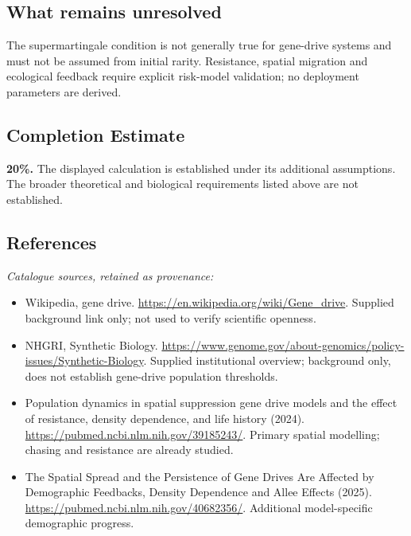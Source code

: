 \documentclass[11pt]{article}
\begin{document}
\subsection{What remains unresolved}
The supermartingale condition is not generally true for gene-drive systems and must not be assumed from initial rarity. Resistance, spatial migration and ecological feedback require explicit risk-model validation; no deployment parameters are derived.
\subsection{Completion Estimate}
\textbf{20\%.} The displayed calculation is established under its additional assumptions. The broader theoretical and biological requirements listed above are not established.
\subsection{References}
\noindent\emph{Catalogue sources, retained as provenance:}
\begin{itemize}
\item Wikipedia, gene drive. \url{https://en.wikipedia.org/wiki/Gene_drive}. Supplied background link only; not used to verify scientific openness.
\item NHGRI, Synthetic Biology. \url{https://www.genome.gov/about-genomics/policy-issues/Synthetic-Biology}. Supplied institutional overview; background only, does not establish gene-drive population thresholds.
\item Population dynamics in spatial suppression gene drive models and the effect of resistance, density dependence, and life history (2024). \url{https://pubmed.ncbi.nlm.nih.gov/39185243/}. Primary spatial modelling; chasing and resistance are already studied.
\item The Spatial Spread and the Persistence of Gene Drives Are Affected by Demographic Feedbacks, Density Dependence and Allee Effects (2025). \url{https://pubmed.ncbi.nlm.nih.gov/40682356/}. Additional model-specific demographic progress.
\end{itemize}
\clearpage


\appendix
\end{document}
